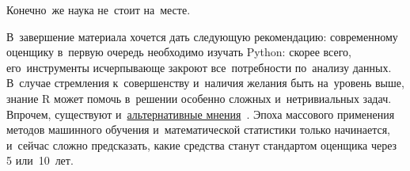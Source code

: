 \documentclass[]{scrreprt}
\begin{document}
Конечно~же наука не~стоит на~месте.

В~завершение материала хочется дать следующую рекомендацию: современному оценщику в~первую очередь необходимо изучать Python: скорее всего, его~инструменты исчерпывающе закроют все~потребности по~анализу данных. В~случае стремления к~совершенству и~наличия желания быть на~уровень выше, знание R может помочь в~решении особенно сложных и~нетривиальных задач. Впрочем, существуют и~\href{https://habr.com/ru/post/670250/}{альтернативные мнения}~\cite{Habr:Python-or-R}. Эпоха массового применения методов машинного обучения и~математической статистики только начинается, и~сейчас сложно предсказать, какие средства станут стандартом оценщика через 5 или~10~лет.
\clearpage
\printbibliography[title=Источники информации]
\end{document}
